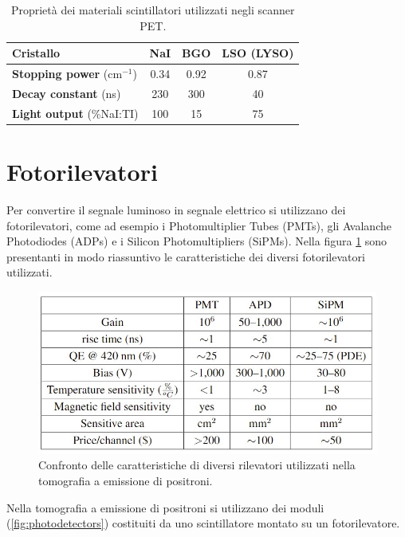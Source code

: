 \begin{table}[tbh]
	\centering
	\begin{tabular}{l|ccc}
		\hline
		\textbf{Cristallo} & NaI & BGO & LSO (LYSO) \\ \hline
		\textbf{Stopping power} ($\unit{\centi\meter}^{-1}$) & 0.34 & 0.92 & 0.87  \\ \hline
		\textbf{Decay constant} (\unit{\nano\second}) & 230 & 300 & 40 \\ \hline
		\textbf{Light output} (\%NaI:TI) & 100 & 15 & 75 \\ \hline
	\end{tabular}
	\caption{Proprietà dei materiali scintillatori utilizzati negli scanner PET\cite{RamseyDerek}.}
	\label{tab:scintillator_properties}
\end{table}

\section{Fotorilevatori}
Per convertire il segnale luminoso in segnale elettrico si utilizzano dei fotorilevatori, come ad esempio i Photomultiplier Tubes (PMTs), gli Avalanche Photodiodes (ADPs) e i Silicon Photomultipliers (SiPMs). Nella figura \ref{fig:photodetectors_performance} sono presentanti in modo riassuntivo le caratteristiche dei diversi fotorilevatori utilizzati.
\begin{figure}[tbh]
	\centering
	\includegraphics[width=0.7\linewidth]{./ImageFiles/table_pet_detectors_properties.jpg}
	\caption{Confronto delle caratteristiche di diversi rilevatori utilizzati nella tomografia a emissione di positroni\cite{Spanoudaki2010}.} 
	\label{fig:photodetectors_performance}
\end{figure}
Nella tomografia a emissione di positroni si utilizzano dei moduli (\Fig\ref{fig:photodetectors}) costituiti da uno scintillatore montato su un fotorilevatore.
